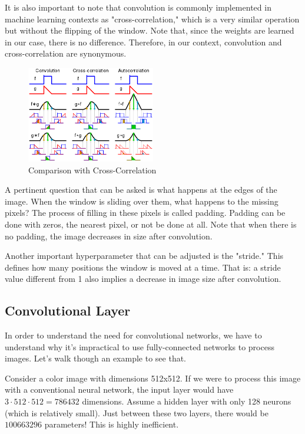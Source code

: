 It is also important to note that convolution is commonly implemented in machine learning contexts as "cross-correlation," which is a very similar operation but without the flipping of the window. Note that, since the weights are learned in our case, there is no difference. Therefore, in our context, convolution and cross-correlation are synonymous.

\begin{figure}[h!]
    \centering
    \includegraphics[width=0.5\textwidth]{figuras/cross-correlation.png}
    \caption{Comparison with Cross-Correlation}
\end{figure}

A pertinent question that can be asked is what happens at the edges of the image. When the window is sliding over them, what happens to the missing pixels? The process of filling in these pixels is called padding. Padding can be done with zeros, the nearest pixel, or not be done at all. Note that when there is no padding, the image decreases in size after convolution.

Another important hyperparameter that can be adjusted is the "stride." This defines how many positions the window is moved at a time. That is: a stride value different from 1 also implies a decrease in image size after convolution.

\subsection{Convolutional Layer}

In order to understand the need for convolutional networks, we have to understand why it's impractical to use fully-connected networks to process images. Let's walk though an example to see that. 

Consider a color image with dimensions 512x512. If we were to process this image with a conventional neural network, the input layer would have \( 3 \cdot 512 \cdot 512 = 786432 \) dimensions. Assume a hidden layer with only 128 neurons (which is relatively small). Just between these two layers, there would be \( 100663296 \) parameters! This is highly inefficient.

